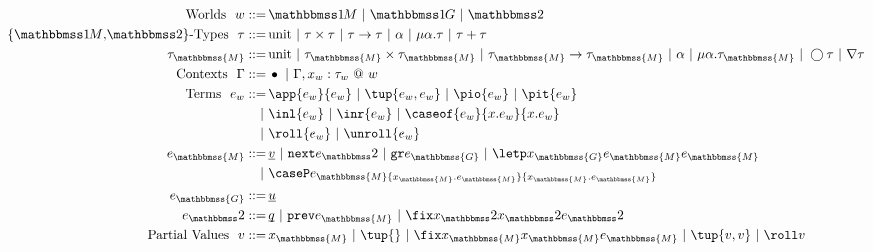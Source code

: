 
\newcommand{\exprM}{e_\mathbbmss{M}}
\newcommand{\exprG}{e_\mathbbmss{G}}
\newcommand{\exprT}{e_\bbtwo}
\newcommand{\varM}{x_\mathbbmss{M}}
\newcommand{\varG}{x_\mathbbmss{G}}
\newcommand{\varT}{x_\bbtwo}
\newcommand{\typeM}{\tau_\mathbbmss{M}}
\newcommand{\typeG}{\tau_\mathbbmss{G}}
\newcommand{\typeT}{\tau_\bbtwo}

\begin{figure}[t]
\begin{abstrsyn}
\[\begin{aligned}
\text{Worlds}\ \ 
\world ::=\,& \bbonem \gbar \bbonep \gbar \bbtwo  \\
%
\text{\{\bbonem,\bbtwo\}-Types}\ \ 
\type ::=\,& \text{unit}
 \gbar \type \times \type
 \gbar \type \to \type
 \gbar \alpha \gbar \mu \alpha.\tau 
 \gbar \tau + \tau \\
\typeM ::=\,& \text{unit}
 \gbar \typeM \times \typeM
 \gbar \typeM \to \typeM
 \gbar \alpha \gbar \mu \alpha.\typeM 
 \gbar \fut \tau 
 \gbar \curr \tau \\
%
%
\text{Contexts}\ \ 
\context ::=\,&\emptyC
 \gbar \context, x_w:\tau_w~@~w \\
%
\text{Terms}\ \ 
e_w ::=\,& \app {e_w} {e_w} 
 \gbar \tup{e_w, e_w}
 \gbar \pio {e_w} 
 \gbar \pit {e_w} \\
\gbar& \inl {e_w} \gbar \inr {e_w}
 \gbar \caseof {e_w}{\var.e_w}{\var.e_w} \\
\gbar& \roll {e_w} \gbar \unroll {e_w} \\
\exprM ::=\,& \exv v
 \gbar \next \exprT 
 \gbar \pure \exprG 
 \gbar \letp \varG \exprM \exprM \\
\gbar& \caseP \exprM {\varM.\exprM} {\varM.\exprM} \\
\exprG ::=\,& \exv u \\ 
\exprT ::=\,& \exv q
 \gbar \prev \exprM 
 \gbar \fix \varT \varT \exprT \\ 
\text{Partial Values}\ \ 
v ::=\,& \varM
 \gbar\tup{}
 \gbar \fix \varM \varM \exprM
 \gbar \tup{v, v} 
 \gbar \roll v \\

\end{aligned}\]
\end{abstrsyn}
\end{figure}
